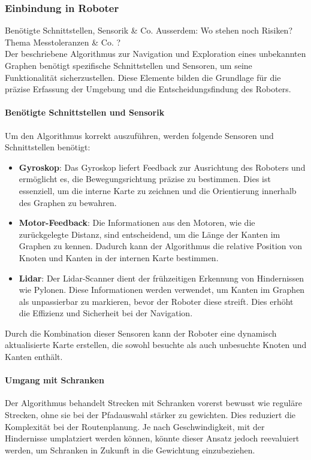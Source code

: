 \documentclass[main.tex]{subfiles} %
\begin{document}
\subsubsection{Einbindung in Roboter}
Benötigte Schnittstellen, Sensorik \& Co. Ausserdem: Wo stehen noch Risiken?
Thema Messtoleranzen \& Co. ?\\

Der beschriebene Algorithmus zur Navigation und Exploration eines unbekannten
Graphen benötigt spezifische Schnittstellen und Sensoren, um seine
Funktionalität sicherzustellen. Diese Elemente bilden die Grundlage für die
präzise Erfassung der Umgebung und die Entscheidungsfindung des Roboters.

\paragraph{Benötigte Schnittstellen und Sensorik}
Um den Algorithmus korrekt auszuführen, werden folgende Sensoren und
Schnittstellen benötigt:

\begin{itemize}
  \item \textbf{Gyroskop}:
        Das Gyroskop liefert Feedback zur Ausrichtung des Roboters und
        ermöglicht es, die Bewegungsrichtung präzise zu bestimmen. Dies
        ist essenziell, um die interne Karte zu zeichnen und die
        Orientierung innerhalb des Graphen zu bewahren.

  \item \textbf{Motor-Feedback}:
        Die Informationen aus den Motoren, wie die zurückgelegte Distanz,
        sind entscheidend, um die Länge der Kanten im Graphen zu kennen.
        Dadurch kann der Algorithmus die relative Position von Knoten und
        Kanten in der internen Karte bestimmen.

  \item \textbf{Lidar}:
        Der Lidar-Scanner dient der frühzeitigen Erkennung von
        Hindernissen wie Pylonen. Diese Informationen werden verwendet,
        um Kanten im Graphen als unpassierbar zu markieren, bevor der
        Roboter diese streift. Dies erhöht die Effizienz und Sicherheit
        bei der Navigation.

\end{itemize}

Durch die Kombination dieser Sensoren kann der Roboter eine dynamisch
aktualisierte Karte erstellen, die sowohl besuchte als auch unbesuchte Knoten
und Kanten enthält.

\paragraph{Umgang mit Schranken}
Der Algorithmus behandelt Strecken mit Schranken vorerst bewusst wie reguläre
Strecken, ohne sie bei der Pfadauswahl stärker zu gewichten. Dies reduziert die
Komplexität bei der Routenplanung. Je nach Geschwindigkeit, mit der Hindernisse
umplatziert werden können, könnte dieser Ansatz jedoch reevaluiert werden, um
Schranken in Zukunft in die Gewichtung einzubeziehen.
\end{document}

